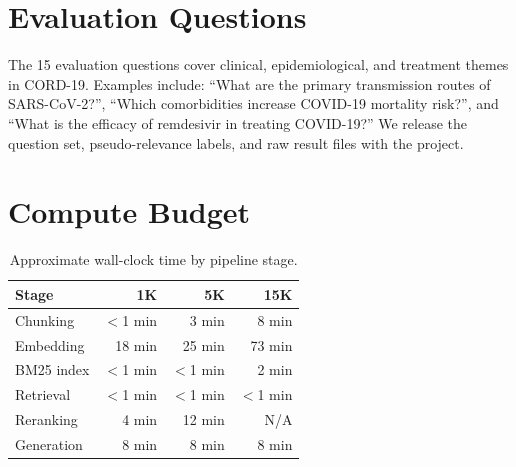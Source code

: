 \documentclass[11pt]{article}
\begin{document}
\section{Evaluation Questions}

The 15 evaluation questions cover clinical, epidemiological, and treatment themes in CORD-19. Examples include: ``What are the primary transmission routes of SARS-CoV-2?'', ``Which comorbidities increase COVID-19 mortality risk?'', and ``What is the efficacy of remdesivir in treating COVID-19?'' We release the question set, pseudo-relevance labels, and raw result files with the project.

\section{Compute Budget}

\begin{table}[H]
\centering
\small
\caption{Approximate wall-clock time by pipeline stage.}
\begin{tabular}{lrrr}
\toprule
Stage & 1K & 5K & 15K \\
\midrule
Chunking & $<$1 min & 3 min & 8 min \\
Embedding & 18 min & 25 min & 73 min \\
BM25 index & $<$1 min & $<$1 min & 2 min \\
Retrieval & $<$1 min & $<$1 min & $<$1 min \\
Reranking & 4 min & 12 min & N/A \\
Generation & 8 min & 8 min & 8 min \\
\bottomrule
\end{tabular}
\end{table}
\end{document}
